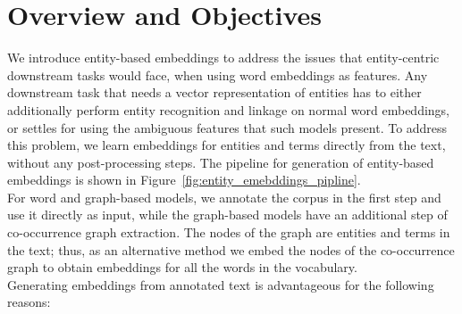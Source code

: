 \section{Overview and Objectives}\label{sec:entity_overview}
We introduce entity-based embeddings to address the issues that entity-centric downstream tasks would face, when using word embeddings as features. Any downstream task that needs a vector representation of entities has to either additionally perform entity recognition and linkage on normal word embeddings, or settles for using the ambiguous features that such models present. To address this problem, we learn embeddings for entities and terms directly from the text, without any post-processing steps. The pipeline for generation of entity-based embeddings is shown in Figure~\ref{fig:entity_emebddings_pipline}.\\
For word and graph-based models, we annotate the corpus in the first step and use it directly as input, while the graph-based models have an additional step of co-occurrence graph extraction. The nodes of the graph are entities and terms in the text; thus, as an alternative method we embed the nodes of the co-occurrence graph to obtain embeddings for all the words in the vocabulary. \\
Generating embeddings from annotated text is advantageous for the following reasons:
